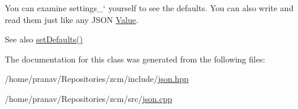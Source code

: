 You can examine \textquotesingle{}settings\+\_\+` yourself to see the defaults. You can also write and read them just like any J\+S\+ON \hyperlink{classJson_1_1Value}{Value}. \begin{DoxySeeAlso}{See also}
\hyperlink{classJson_1_1StreamWriterBuilder_a53bf106b141e28637b01ad0ecd2acbf6}{set\+Defaults()} 
\end{DoxySeeAlso}


The documentation for this class was generated from the following files\+:\begin{DoxyCompactItemize}
\item 
/home/pranav/\+Repositories/zcm/include/\hyperlink{json_8hpp}{json.\+hpp}\item 
/home/pranav/\+Repositories/zcm/src/\hyperlink{json_8cpp}{json.\+cpp}\end{DoxyCompactItemize}
